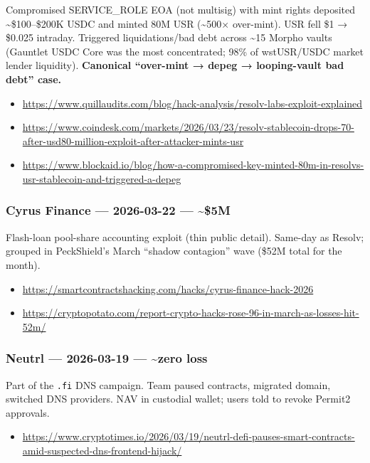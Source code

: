 Compromised SERVICE\_ROLE EOA (not multisig) with mint rights deposited \textasciitilde\$100--\$200K USDC and minted 80M USR (\textasciitilde500× over-mint). USR fell \$1 → \$0.025 intraday. Triggered liquidations/bad debt across \textasciitilde15 Morpho vaults (Gauntlet USDC Core was the most concentrated; 98\% of wstUSR/USDC market lender liquidity). \textbf{Canonical ``over-mint → depeg → looping-vault bad debt'' case.}

\begin{itemize}
\tightlist
\item
  \url{https://www.quillaudits.com/blog/hack-analysis/resolv-labs-exploit-explained}
\item
  \url{https://www.coindesk.com/markets/2026/03/23/resolv-stablecoin-drops-70-after-usd80-million-exploit-after-attacker-mints-usr}
\item
  \url{https://www.blockaid.io/blog/how-a-compromised-key-minted-80m-in-resolvs-usr-stablecoin-and-triggered-a-depeg}
\end{itemize}

\subsubsection{Cyrus Finance --- 2026-03-22 --- \textasciitilde\$5M}\label{cyrus-finance-2026-03-22-5m}

Flash-loan pool-share accounting exploit (thin public detail). Same-day as Resolv; grouped in PeckShield's March ``shadow contagion'' wave (\$52M total for the month).

\begin{itemize}
\tightlist
\item
  \url{https://smartcontractshacking.com/hacks/cyrus-finance-hack-2026}
\item
  \url{https://cryptopotato.com/report-crypto-hacks-rose-96-in-march-as-losses-hit-52m/}
\end{itemize}

\subsubsection{Neutrl --- 2026-03-19 --- \textasciitilde zero loss}\label{neutrl-2026-03-19-zero-loss}

Part of the \texttt{.fi} DNS campaign. Team paused contracts, migrated domain, switched DNS providers. NAV in custodial wallet; users told to revoke Permit2 approvals.

\begin{itemize}
\tightlist
\item
  \url{https://www.cryptotimes.io/2026/03/19/neutrl-defi-pauses-smart-contracts-amid-suspected-dns-frontend-hijack/}
\end{itemize}

